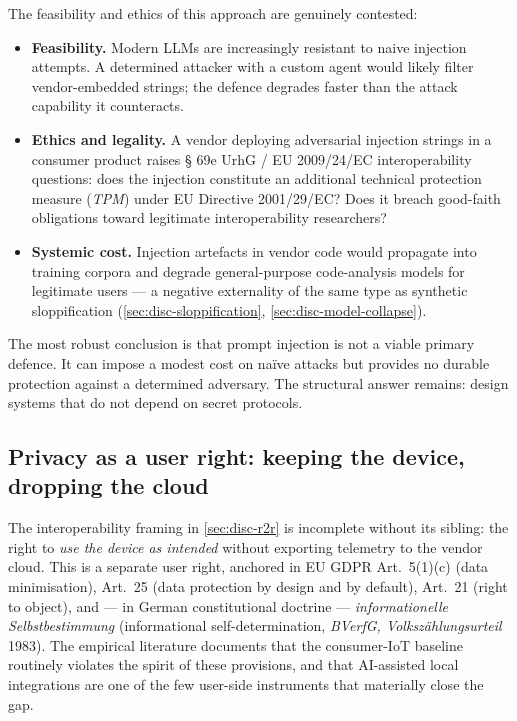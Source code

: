 \documentclass[11pt,a4paper]{article}
\begin{document}
The feasibility and ethics of this approach are genuinely contested:
\begin{itemize}
  \item \textbf{Feasibility.} Modern LLMs are increasingly resistant to
        naive injection attempts. A determined attacker with a custom
        agent would likely filter vendor-embedded strings; the defence
        degrades faster than the attack capability it counteracts.
  \item \textbf{Ethics and legality.} A vendor deploying adversarial
        injection strings in a consumer product raises
        \S{} 69e UrhG / EU 2009/24/EC interoperability questions: does
        the injection constitute an additional technical protection measure
        (\emph{TPM}) under EU Directive 2001/29/EC? Does it breach
        good-faith obligations toward legitimate interoperability
        researchers?
  \item \textbf{Systemic cost.} Injection artefacts in vendor code would
        propagate into training corpora and degrade general-purpose
        code-analysis models for legitimate users --- a negative
        externality of the same type as synthetic sloppification
        (\cref{sec:disc-sloppification}, \cref{sec:disc-model-collapse}).
\end{itemize}

The most robust conclusion is that prompt injection is not a viable
primary defence. It can impose a modest cost on na\"ive attacks but
provides no durable protection against a determined adversary. The
structural answer remains: design systems that do not depend on secret
protocols.

\subsection{Privacy as a user right: keeping the device, dropping the cloud}
\label{sec:disc-privacy}
The interoperability framing in
\cref{sec:disc-r2r} is incomplete without its sibling: the
right to \emph{use the device as intended} without exporting telemetry to
the vendor cloud. This is a separate user right, anchored in EU GDPR
Art.\ 5(1)(c) (data minimisation), Art.\ 25 (data protection by design and
by default), Art.\ 21 (right to object), and --- in German constitutional
doctrine --- \emph{informationelle Selbstbestimmung} (informational
self-determination, \emph{BVerfG, Volksz\"ahlungsurteil} 1983). The
empirical literature documents that the consumer-IoT baseline routinely
violates the spirit of these provisions, and that AI-assisted local
integrations are one of the few user-side instruments that materially
close the gap.
\end{document}
